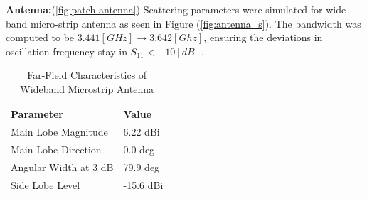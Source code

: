 \textbf{Antenna:}(\ref{fig:patch-antenna})
Scattering parameters were simulated for wide band micro-strip antenna as seen in Figure (\ref{fig:antenna_s}). The bandwidth was computed to be \(3.441[GHz]\to 3.642[Ghz]\), ensuring the deviations in oscillation frequency stay in \(S_{11}<-10[dB]\).

\begin{table}[H]
\centering
\caption{Far-Field Characteristics of Wideband Microstrip Antenna}
\label{table:antenna_characteristics}
\begin{tabularx}{0.7\linewidth}{|X|X|}
\hline
\textbf{Parameter} & \textbf{Value} \\
\hline
Main Lobe Magnitude & 6.22 dBi \\
Main Lobe Direction & 0.0 deg \\
Angular Width at 3 dB & 79.9 deg \\
Side Lobe Level & -15.6 dBi \\
\hline
\end{tabularx}
\end{table}